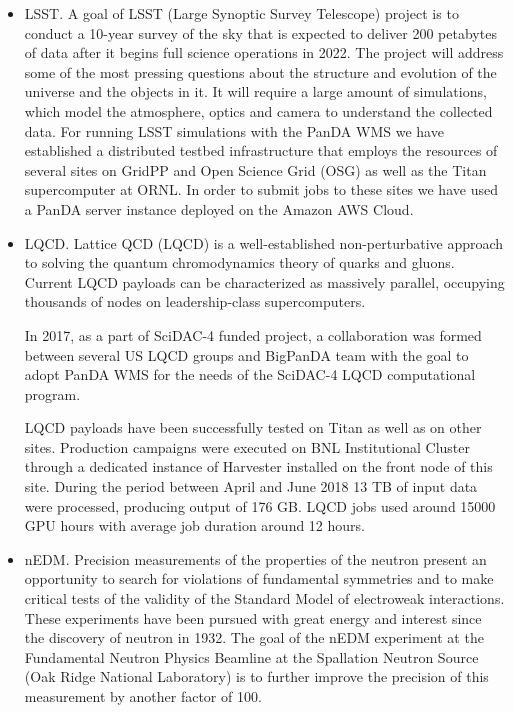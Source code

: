 \begin{itemize}
    \item LSST.
A goal of LSST (Large Synoptic Survey Telescope) project is to conduct a
10-year survey of the sky that is expected to deliver 200 petabytes of data
after it begins full science operations in 2022. The project  will address some
of the most pressing questions about the structure and evolution of the
universe and the objects in it. It will require a large amount of simulations,
which model the atmosphere, optics and camera to understand the collected data.
For running LSST simulations with the PanDA WMS we have established a
distributed testbed infrastructure that employs the resources of several sites
on GridPP \cite{0954-3899-32-1-N01} and Open Science Grid (OSG) \cite{1742-6596-78-1-012057} as well as the Titan
supercomputer at ORNL. In order to submit jobs to these sites we have used a
PanDA server instance deployed on the Amazon AWS Cloud.

    \item LQCD.
Lattice QCD (LQCD) \cite{Babich:2010:PQL:1884643.1884695} is a well-established 
non-perturbative approach to solving the quantum chromodynamics theory of quarks 
and gluons.  Current LQCD payloads can be characterized as massively parallel, 
occupying thousands of nodes on leadership-class supercomputers.

In 2017, as a part of SciDAC-4 funded project, a collaboration was formed between 
several US LQCD groups and BigPanDA team with the goal to adopt PanDA WMS for the 
needs of the SciDAC-4 LQCD computational program. 

LQCD payloads have been successfully tested on Titan as well as on other sites.
Production campaigns were executed on BNL Institutional Cluster through a 
dedicated instance of Harvester installed on the front node of this site. 
During the period between April and June 2018 13 TB 
of input data were processed, producing output of 176 GB. LQCD jobs used around 
15000 GPU hours with average job duration around 12 hours.

    \item nEDM.
Precision measurements of the properties of the neutron present an opportunity
to search for violations of fundamental symmetries and to make critical tests
of the validity of the Standard Model of electroweak interactions. These
experiments have been pursued \cite{Sakharov:1967dj} with great energy and interest since
the discovery of neutron in 1932. The goal of the nEDM \cite{0954-3899-36-10-104002} experiment at the
Fundamental Neutron Physics Beamline at the Spallation Neutron Source (Oak
Ridge National Laboratory) is to further improve the precision of this
measurement by another factor of 100.
\end{itemize}

